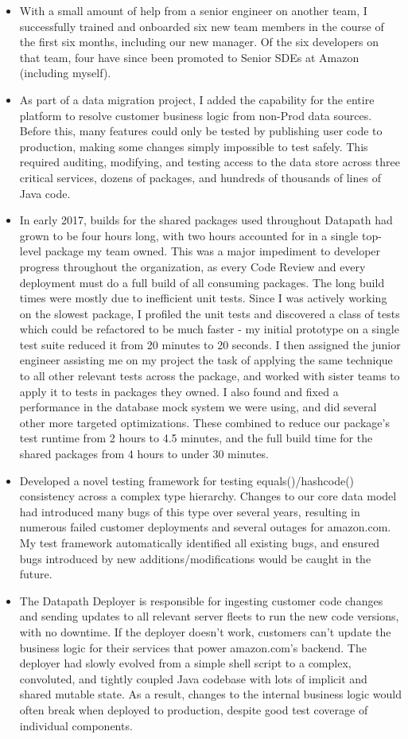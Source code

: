 \documentclass{res}
\begin{document}
\begin{resume}
\begin{itemize}
	\item With a small amount of help from a senior engineer on another team, I successfully trained and onboarded six new team members in the course of the first six months, including our new manager.  Of the six developers on that team, four have since been promoted to Senior SDEs at Amazon (including myself).
   \item As part of a data migration project, I added the capability for the entire platform to resolve customer business logic from non-Prod data sources.  Before this, many features could only be tested by publishing user code to production, making some changes simply impossible to test safely.  This required auditing, modifying, and testing access to the data store across three critical services, dozens of packages, and hundreds of thousands of lines of Java code.
   \item In early 2017, builds for the shared packages used throughout Datapath had grown to be four hours long, with two hours accounted for in a single top-level package my team owned.  This was a major impediment to developer progress throughout the organization, as every Code Review and every deployment must do a full build of all consuming packages.  The long build times were mostly due to inefficient unit tests.  Since I was actively working on the slowest package, I profiled the unit tests and discovered a class of tests which could be refactored to be much faster - my initial prototype on a single test suite reduced it from 20 minutes to 20 seconds.  I then assigned the junior engineer assisting me on my project the task of applying the same technique to all other relevant tests across the package, and worked with sister teams to apply it to tests in packages they owned.  I also found and fixed a performance in the database mock system we were using, and did several other more targeted optimizations. These combined to reduce our package’s test runtime from 2 hours to 4.5 minutes, and the full build time for the shared packages from 4 hours to under 30 minutes.
   \item Developed a novel testing framework for testing equals()/hashcode() consistency across a complex type hierarchy.  Changes to our core data model had introduced many bugs of this type over several years, resulting in numerous failed customer deployments and several outages for amazon.com.  My test framework automatically identified all existing bugs, and ensured bugs introduced by new additions/modifications would be caught in the future.
   \item The Datapath Deployer is responsible for ingesting customer code changes and sending updates to all relevant server fleets to run the new code versions, with no downtime.  If the deployer doesn’t work, customers can’t update the business logic for their services that power amazon.com's backend.  The deployer had slowly evolved from a simple shell script to a complex, convoluted, and tightly coupled Java codebase with lots of implicit and shared mutable state.  As a result, changes to the internal business logic would often break when deployed to production, despite good test coverage of individual components.\\

\end{itemize}
\end{resume}
\end{document}
